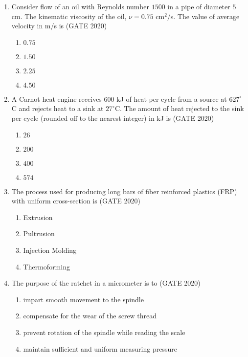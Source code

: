 \documentclass[journal,12pt,onecolumn]{IEEEtran}
\theoremstyle{remark}
\begin{document}
\begin{enumerate}
\item Consider flow of an oil with Reynolds number $1500$ in a pipe of diameter $5$ cm. The kinematic viscosity of the oil, $\nu = 0.75$ cm$^2$/s. The value of average velocity in m/s is
\hfill{(GATE 2020)}
\begin{multicols}{4}
\begin{enumerate}
    \item $0.75$
    \item $1.50$
    \item $2.25$
    \item $4.50$
\end{enumerate}
\end{multicols}
\vspace{1cm}
\newpage
\item A Carnot heat engine receives $600$ kJ of heat per cycle from a source at $627^\circ$C and rejects heat to a sink at $27^\circ$C. The amount of heat rejected to the sink per cycle (rounded off to the nearest integer) in kJ is
\hfill{(GATE 2020)}
\begin{multicols}{4}
\begin{enumerate}
    \item $26$
    \item $200$
    \item $400$
    \item $574$
\end{enumerate}
\end{multicols}
\vspace{1cm}

\item The process used for producing long bars of fiber reinforced plastics (FRP) with uniform cross-section is
\hfill{(GATE 2020)}
\begin{multicols}{4}
\begin{enumerate}
    \item Extrusion
    \item Pultrusion
    \item Injection Molding
    \item Thermoforming
\end{enumerate}
\end{multicols}
\vspace{1cm}

\item The purpose of the ratchet in a micrometer is to
\hfill{(GATE 2020)}
\begin{enumerate}
    \item impart smooth movement to the spindle
    \item compensate for the wear of the screw thread
    \item prevent rotation of the spindle while reading the scale
    \item maintain sufficient and uniform measuring pressure
\end{enumerate}
\vspace{1cm}


\end{enumerate}
\end{document}
